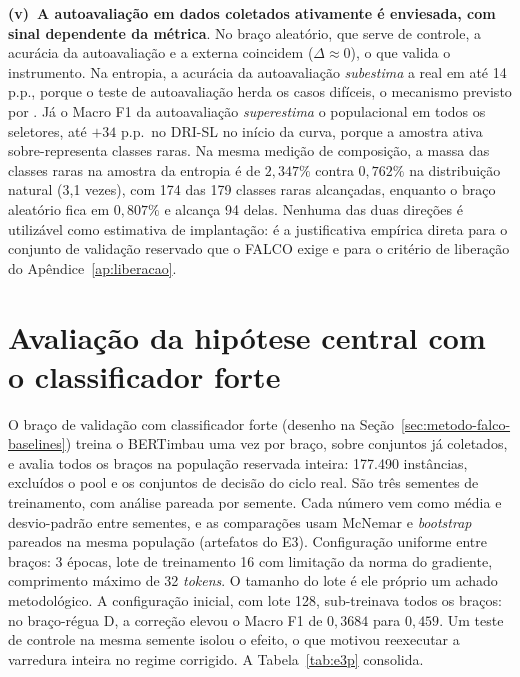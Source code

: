 \textbf{(v)~A autoavaliação em dados coletados ativamente é enviesada, com
sinal dependente da métrica}. No braço aleatório, que serve de controle, a
acurácia da autoavaliação e a externa coincidem ($\Delta \approx 0$), o que valida
o instrumento. Na entropia, a acurácia da autoavaliação \emph{subestima} a real
em até 14 p.p., porque o teste de autoavaliação herda os casos difíceis, o
mecanismo previsto por \citealp{Kossen2021ActiveTesting}. Já o Macro F1 da
autoavaliação \emph{superestima} o populacional em todos os seletores, até
$+34$ p.p.\ no DRI-SL no início da curva, porque a amostra ativa
sobre-representa classes raras. Na mesma medição de composição, a massa das
classes raras na amostra da entropia é de $2{,}347\%$ contra $0{,}762\%$ na
distribuição natural (3,1 vezes), com 174 das 179 classes raras alcançadas,
enquanto o braço aleatório fica em $0{,}807\%$ e alcança 94 delas.
Nenhuma das duas direções é utilizável como estimativa de implantação:
é a justificativa empírica direta para o conjunto de validação reservado que
o FALCO exige e para o critério de liberação do Apêndice~\ref{ap:liberacao}.

\section{Avaliação da hipótese central com o classificador forte}
\label{sec:res-e3p}

O braço de validação com classificador forte (desenho na
Seção~\ref{sec:metodo-falco-baselines}) treina o BERTimbau uma vez por braço,
sobre conjuntos já coletados, e avalia todos os braços na população reservada
inteira: 177.490 instâncias, excluídos o pool e os conjuntos de decisão do
ciclo real. São três sementes de treinamento, com análise pareada por semente.
Cada número vem como média e desvio-padrão entre sementes, e as comparações
usam McNemar e \textit{bootstrap} pareados na mesma população (artefatos do
E3). Configuração
uniforme entre braços: 3 épocas, lote de treinamento 16 com limitação da
norma do gradiente, comprimento máximo de 32 \textit{tokens}. O tamanho do lote é ele próprio um achado metodológico. A
configuração inicial, com lote 128, sub-treinava todos os braços: no
braço-régua D, a correção elevou o Macro F1 de $0{,}3684$ para $0{,}459$. Um
teste de controle na mesma semente isolou o efeito, o que motivou reexecutar a
varredura inteira no regime corrigido. A
Tabela~\ref{tab:e3p} consolida.

